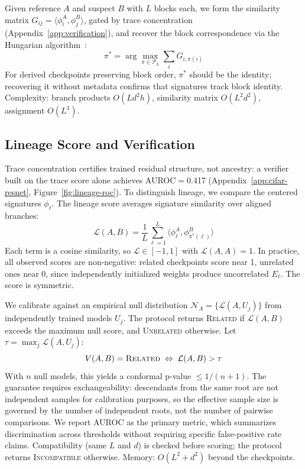 Given reference $A$ and suspect $B$ with $L$ blocks each, we form the similarity matrix $G_{ij} = \langle \phi^A_i, \phi^B_j \rangle$, gated by trace concentration (Appendix~\ref{app:verification}), and recover the block correspondence via the Hungarian algorithm~\citep{kuhn1955hungarian}:
\begin{equation}\label{eq:hungarian}
\pi^* = \arg\max_{\pi \in \mathcal{P}_L} \sum_{i} G_{i,\pi(i)}
\end{equation}
For derived checkpoints preserving block order, $\pi^*$ should be the identity; recovering it without metadata confirms that signatures track block identity. Complexity: branch products $O(Ld^2 h)$, similarity matrix $O(L^2 d^2)$, assignment $O(L^3)$.

\subsection{Lineage Score and Verification}\label{sec:lineage-score}

Trace concentration certifies trained residual structure, not ancestry: a verifier built on the trace score alone achieves AUROC$=$0.417 (Appendix~\ref{app:cifar-resnet}, Figure~\ref{fig:lineage-roc}). To distinguish lineage, we compare the centered signatures $\phi_\ell$. The lineage score averages signature similarity over aligned branches:
\begin{equation}\label{eq:lineage-score}
\mathcal{L}(A, B) = \frac{1}{L} \sum_{\ell=1}^{L} \langle \phi^A_\ell, \phi^B_{\pi^*(\ell)} \rangle
\end{equation}
Each term is a cosine similarity, so $\mathcal{L} \in [-1,1]$ with $\mathcal{L}(A,A) = 1$. In practice, all observed scores are non-negative: related checkpoints score near 1, unrelated ones near 0, since independently initialized weights produce uncorrelated $E_\ell$. The score is symmetric.

We calibrate against an empirical null distribution $\mathcal{N}_A = \{\mathcal{L}(A, U_j)\}$ from independently trained models $U_j$. The protocol returns \textsc{Related} if $\mathcal{L}(A,B)$ exceeds the maximum null score, and \textsc{Unrelated} otherwise. Let $\tau = \max_j \mathcal{L}(A, U_j)$:
\begin{equation}\label{eq:verdict}
V(A,B) = \textsc{Related} \;\Leftrightarrow\; \mathcal{L}(A,B) > \tau
\end{equation}
With $n$ null models, this yields a conformal p-value $\leq 1/(n+1)$. The guarantee requires exchangeability: descendants from the same root are not independent samples for calibration purposes, so the effective sample size is governed by the number of independent roots, not the number of pairwise comparisons. We report AUROC as the primary metric, which summarizes discrimination across thresholds without requiring specific false-positive rate claims. Compatibility (same $L$ and $d$) is checked before scoring; the protocol returns \textsc{Incompatible} otherwise. Memory: $O(L^2 + d^2)$ beyond the checkpoints.
